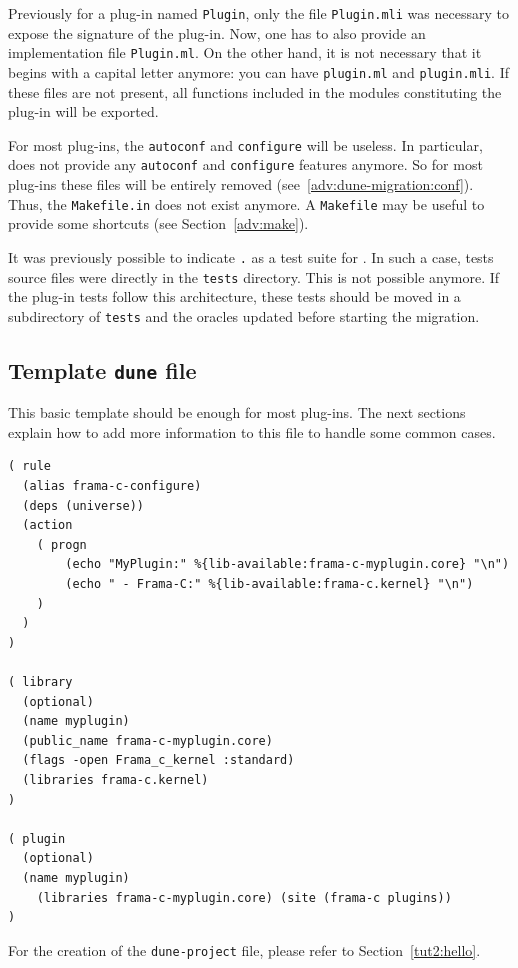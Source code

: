 Previously for a plug-in named \texttt{Plugin}, only the file
\texttt{Plugin.mli} was necessary to expose the signature of the plug-in. Now,
one has to also provide an implementation file \texttt{Plugin.ml}.
On the other hand, it is not necessary that it begins with a capital letter
anymore: you can have \texttt{plugin.ml} and \texttt{plugin.mli}. If these files
are not present, all functions included in the modules constituting the
plug-in will be exported.

For most plug-ins, the \texttt{autoconf} and \texttt{configure} will be useless.
In particular, \framac does not provide any \texttt{autoconf} and
\texttt{configure} features anymore. So for most plug-ins these files will be
entirely removed (see~\ref{adv:dune-migration:conf}). Thus, the
\texttt{Makefile.in} does not exist anymore. A \texttt{Makefile} may be useful
to provide some shortcuts (see Section~\ref{adv:make}).

It was previously possible to indicate \texttt{.} as a test suite for \ptests.
In such a case, tests source files were directly in the \texttt{tests} directory.
This is not possible anymore. If the plug-in tests follow this architecture,
these tests should be moved in a subdirectory of \texttt{tests} and the oracles
updated before starting the migration.

\subsection{Template \texttt{dune} file}

This basic template should be enough for most plug-ins. The next sections
explain how to add more information to this file to handle some common cases.

\begin{lstlisting}[language=Dune]
( rule
  (alias frama-c-configure)
  (deps (universe))
  (action
    ( progn
        (echo "MyPlugin:" %{lib-available:frama-c-myplugin.core} "\n")
        (echo " - Frama-C:" %{lib-available:frama-c.kernel} "\n")
    )
  )
)

( library
  (optional)
  (name myplugin)
  (public_name frama-c-myplugin.core)
  (flags -open Frama_c_kernel :standard)
  (libraries frama-c.kernel)
)

( plugin
  (optional)
  (name myplugin)
    (libraries frama-c-myplugin.core) (site (frama-c plugins))
)
\end{lstlisting}

For the creation of the \texttt{dune-project} file, please refer to
Section~\ref{tut2:hello}.

